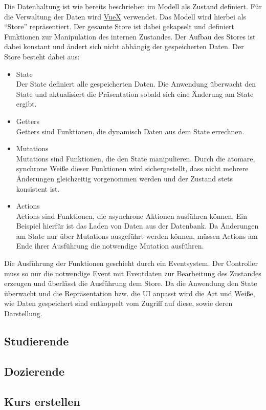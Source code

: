 Die Datenhaltung ist wie bereits beschrieben im Modell als Zustand definiert. Für die Verwaltung der Daten wird \href{https://vuex.vuejs.org/}{VueX} verwendet.
Das Modell wird hierbei als \enquote{Store} repräsentiert.
Der gesamte Store ist dabei gekapselt und definiert Funktionen zur Manipulation des internen Zustandes. Der Aufbau des Stores ist dabei konstant und ändert sich nicht abhängig der gespeicherten Daten.
Der Store besteht dabei aus:
\begin{itemize}
    \item State\\
        Der State definiert alle gespeicherten Daten. Die Anwendung überwacht den State und aktualisiert die Präsentation sobald sich eine Änderung am State ergibt.
    \item Getters\\
        Getters sind Funktionen, die dynamisch Daten aus dem State errechnen.
    \item Mutations\\
        Mutations sind Funktionen, die den State manipulieren.
        Durch die atomare, synchrone Weiße dieser Funktionen wird sichergestellt, dass nicht mehrere Änderungen gleichzeitig vorgenommen werden und der Zustand stets konsistent ist.
    \item Actions\\
        Actions sind Funktionen, die asynchrone Aktionen ausführen können. Ein Beispiel hierfür ist das Laden von Daten aus der Datenbank. Da Änderungen am State nur über Mutations ausgeführt werden können, müssen Actions am Ende ihrer Ausführung die notwendige Mutation ausführen.
\end{itemize}

Die Ausführung der Funktionen geschieht durch ein Eventsystem. Der Controller muss so nur die notwendige Event mit Eventdaten zur Bearbeitung des Zustandes erzeugen und überlässt die Ausführung dem Store. Da die Anwendung den State überwacht und die Repräsentation bzw. die UI anpasst wird die Art und Weiße, wie Daten gespeichert sind entkoppelt vom Zugriff auf diese, sowie deren Darstellung.


\subsection{Studierende}
\subsection{Dozierende}
\subsection{Kurs erstellen}
